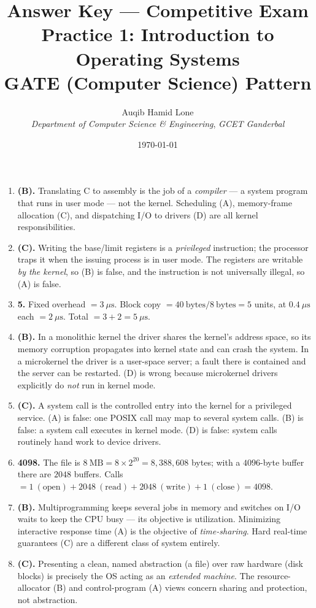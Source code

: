 \documentclass[11pt]{article}
\title{Answer Key --- Competitive Exam Practice 1: Introduction to Operating Systems\\\large GATE (Computer Science) Pattern}
\author{Auqib Hamid Lone\\[0.3em]
  \emph{Department of Computer Science \& Engineering}, \emph{GCET Ganderbal}}
\date{\today}
\begin{document}
\maketitle

\begin{enumerate}
\item[\textbf{Q1}] \textbf{(B).} Translating C to assembly is the job of a \emph{compiler} --- a system program that runs in user mode --- not the kernel. Scheduling (A), memory-frame allocation (C), and dispatching I/O to drivers (D) are all kernel responsibilities.

\item[\textbf{Q2}] \textbf{(C).} Writing the base/limit registers is a \emph{privileged} instruction; the processor traps it when the issuing process is in user mode. The registers are writable \emph{by the kernel}, so (B) is false, and the instruction is not universally illegal, so (A) is false.

\item[\textbf{Q3}] \textbf{5.} Fixed overhead $= 3\ \mu\text{s}$. Block copy $= 40\ \text{bytes} / 8\ \text{bytes} = 5$ units, at $0.4\ \mu\text{s}$ each $= 2\ \mu\text{s}$. Total $= 3 + 2 = 5\ \mu\text{s}$.

\item[\textbf{Q4}] \textbf{(B).} In a monolithic kernel the driver shares the kernel's address space, so its memory corruption propagates into kernel state and can crash the system. In a microkernel the driver is a user-space server; a fault there is contained and the server can be restarted. (D) is wrong because microkernel drivers explicitly do \emph{not} run in kernel mode.

\item[\textbf{Q5}] \textbf{(C).} A system call is the controlled entry into the kernel for a privileged service. (A) is false: one POSIX call may map to several system calls. (B) is false: a system call executes in kernel mode. (D) is false: system calls routinely hand work to device drivers.

\item[\textbf{Q6}] \textbf{4098.} The file is $8\ \text{MB} = 8 \times 2^{20} = 8{,}388{,}608$ bytes; with a $4096$-byte buffer there are $2048$ buffers. Calls $= 1\ (\text{open}) + 2048\ (\text{read}) + 2048\ (\text{write}) + 1\ (\text{close}) = 4098$.

\item[\textbf{Q7}] \textbf{(B).} Multiprogramming keeps several jobs in memory and switches on I/O waits to keep the CPU busy --- its objective is utilization. Minimizing interactive response time (A) is the objective of \emph{time-sharing}. Hard real-time guarantees (C) are a different class of system entirely.

\item[\textbf{Q8}] \textbf{(C).} Presenting a clean, named abstraction (a file) over raw hardware (disk blocks) is precisely the OS acting as an \emph{extended machine}. The resource-allocator (B) and control-program (A) views concern sharing and protection, not abstraction.
\end{enumerate}
\end{document}
